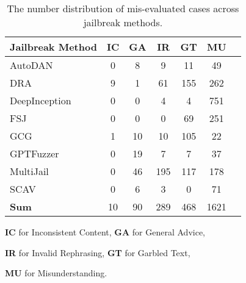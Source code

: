 \begin{table}[htbp]
\caption{The number distribution of mis-evaluated cases across jailbreak methods.}
\centering
\label{tab:jailbreak-errors}
\begin{threeparttable}
\footnotesize
\renewcommand{\arraystretch}{1.2}
\setlength{\tabcolsep}{0.9\tabcolsep}
\setlength{\defaultaddspace}{0.7\defaultaddspace} %
\centering
\begin{tabular}{lcccccc}
\toprule
\textbf{Jailbreak Method} & \textbf{IC} & \textbf{GA} & \textbf{IR} & \textbf{GT} & \textbf{MU} \\
\midrule
AutoDAN & 0 & 8 & 9 & 11 & 49 \\
DRA & 9 & 1 & 61 & 155 & 262 \\
DeepInception & 0 & 0 & 4 & 4 & 751 \\
FSJ & 0 & 0 & 0 & 69 & 251 \\
GCG & 1 & 10 & 10 & 105 & 22 \\
GPTFuzzer & 0 & 19 & 7 & 7 & 37 \\
MultiJail & 0 & 46 & 195 & 117 & 178 \\
SCAV & 0 & 6 & 3 & 0 & 71 \\
\midrule
\textbf{Sum} & 10 & 90 & 289 & 468 & 1621 \\
\bottomrule
\end{tabular}
\begin{tablenotes}
\item \textbf{IC} for Inconsistent Content, \textbf{GA} for General Advice, 
\item \textbf{IR} for Invalid Rephrasing, \textbf{GT} for Garbled Text, 
\item \textbf{MU} for Misunderstanding.
\end{tablenotes}
\end{threeparttable}%
\end{table}


